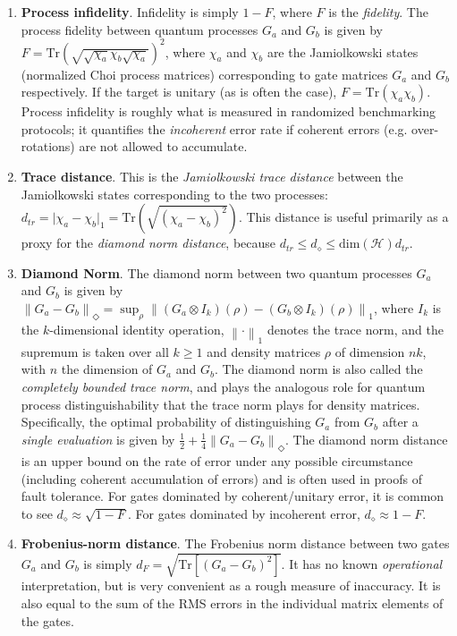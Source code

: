 \documentclass{article}[11pt]
\newcommand{\norm}[1]{\left\lVert#1\right\rVert}
\newcommand{\Tr}[0]{\mathrm{Tr}}
\begin{document}
\begin{enumerate}
\item \textbf{Process infidelity}.  Infidelity is simply $1-F$, where $F$ is the \emph{fidelity}.  The process fidelity between quantum processes $G_a$ and $G_b$ is given by $F = \Tr\left( \sqrt{ \sqrt{\chi_a} \chi_b \sqrt{\chi_a} } \right)^2$, where $\chi_a$ and $\chi_b$ are the Jamiolkowski states (normalized Choi process matrices) corresponding to gate matrices $G_a$ and $G_b$ respectively.  If the target is unitary (as is often the case), $F = \Tr\left( \chi_a \chi_b \right)$.  Process infidelity is roughly what is measured in randomized benchmarking protocols; it quantifies the \emph{incoherent} error rate if coherent errors (e.g. over-rotations) are not allowed to accumulate.
\item \textbf{Trace distance}.  This is the \emph{Jamiolkowski trace distance} between the Jamiolkowski states corresponding to the two processes:  $d_{tr} = \vert\chi_a - \chi_b\vert_1 = \Tr\left(\sqrt{(\chi_a-\chi_b)^2}\right)$.  This distance is useful primarily as a proxy for the \emph{diamond norm distance}, because $d_{tr} \leq d_{\diamond} \leq \mathrm{dim}(\mathcal{H}) d_{tr}$.
\item \textbf{Diamond Norm}.  The diamond norm between two quantum processes $G_a$ and $G_b$ is given by $\norm{G_a - G_b}_\Diamond = \sup_\rho \norm{(G_a \otimes I_k)(\rho) - (G_b \otimes I_k)(\rho)}_1$, where $I_k$ is the $k$-dimensional identity operation, $\norm{\cdot}_1$ denotes the trace norm, and the supremum is taken over all $k \ge 1$ and density matrices $\rho$ of dimension $nk$, with $n$ the dimension of $G_a$ and $G_b$.  The diamond norm is also called the \emph{completely bounded trace norm}, and plays the analogous role for quantum process distinguishability that the trace norm plays for density matrices.  Specifically, the optimal probability of distinguishing $G_a$ from $G_b$ after a \emph{single evaluation} is given by $\frac{1}{2} + \frac{1}{4}\norm{G_a - G_b}_\Diamond$.  The diamond norm distance is an upper bound on the rate of error under any possible circumstance (including coherent accumulation of errors) and is often used in proofs of fault tolerance.  For gates dominated by coherent/unitary error, it is common to see $d_{\diamond} \approx \sqrt{1-F}$.  For gates dominated by incoherent error, $d_{\diamond} \approx 1-F$.
\item \textbf{Frobenius-norm distance}.  The Frobenius norm distance between two gates $G_a$ and $G_b$ is simply $d_F = \sqrt{\Tr\left[\left(G_a-G_b\right)^2\right]}$.  It has no known \emph{operational} interpretation, but is very convenient as a rough measure of inaccuracy.  It is also equal to the sum of the RMS errors in the individual matrix elements of the gates.
\end{enumerate}
\end{document}
